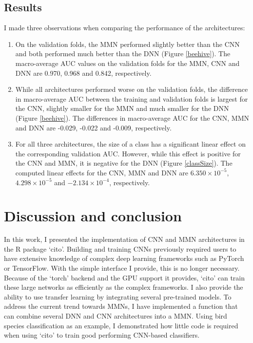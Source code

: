 \documentclass[12pt,twoside]{scrreport}
\newcommand{\pkg}[1]{`#1'}
\begin{document}
\section*{Results}
I made three observations when comparing the performance of the architectures: 
\begin{enumerate}
 \item On the validation folds, the MMN performed slightly better than the CNN and both performed much better than the DNN (Figure \ref{beehive}). The macro-average AUC values on the validation folds for the MMN, CNN and DNN are 0.970, 0.968 and 0.842, respectively.
 \item While all architectures performed worse on the validation folds, the difference in macro-average AUC between the training and validation folds is largest for the CNN, slightly smaller for the MMN and much smaller for the DNN (Figure \ref{beehive}). The differences in macro-average AUC for the CNN, MMN and DNN are -0.029, -0.022 and -0.009, respectively.
 \item For all three architectures, the size of a class has a significant linear effect on the corresponding validation AUC. However, while this effect is positive for the CNN and MMN, it is negative for the DNN (Figure \ref{classSize}). The computed linear effects for the CNN, MMN and DNN are $6.350\times10^{-5}$, $4.298\times10^{-5}$ and $-2.134\times10^{-4}$, respectively.
\end{enumerate}

\chapter*{Discussion and conclusion}
In this work, I presented the implementation of CNN and MMN architectures in the R package \pkg{cito}. Building and training CNNs previously required users to have extensive knowledge of complex deep learning frameworks such as PyTorch or TensorFlow. With the simple interface I provide, this is no longer necessary. Because of the \pkg{torch} backend and the GPU support it provides, \pkg{cito} can train these large networks as efficiently as the complex frameworks. I also provide the ability to use transfer learning by integrating several pre-trained models. To address the current trend towards MMNs, I have implemented a function that can combine several DNN and CNN architectures into a MMN. Using bird species classification as an example, I demonstrated how little code is required when using \pkg{cito} to train good performing CNN-based classifiers.
\end{document}
